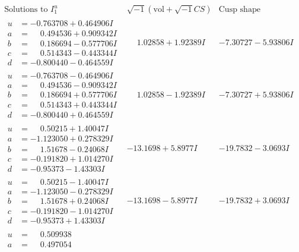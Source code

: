 \documentclass[1p]{elsarticle_modified}
\theoremstyle{definition}
\newcommand{\I}{\sqrt{-1}}
\begin{document}
$$\begin{array}{c|c|c}  
\text{Solutions to }I^u_{1}& \I (\text{vol} + \sqrt{-1}CS) & \text{Cusp shape}\\
 \hline 
\begin{aligned}
u &= -0.763708 + 0.464906 I \\
a &= \phantom{-}0.494536 + 0.909342 I \\
b &= \phantom{-}0.186694 - 0.577706 I \\
c &= \phantom{-}0.514343 - 0.443344 I \\
d &= -0.800440 - 0.464559 I\end{aligned}
 & \phantom{-}1.02858 + 1.92389 I & -7.30727 - 5.93806 I \\ \hline\begin{aligned}
u &= -0.763708 - 0.464906 I \\
a &= \phantom{-}0.494536 - 0.909342 I \\
b &= \phantom{-}0.186694 + 0.577706 I \\
c &= \phantom{-}0.514343 + 0.443344 I \\
d &= -0.800440 + 0.464559 I\end{aligned}
 & \phantom{-}1.02858 - 1.92389 I & -7.30727 + 5.93806 I \\ \hline\begin{aligned}
u &= \phantom{-}0.50215 + 1.40047 I \\
a &= -1.123050 + 0.278329 I \\
b &= \phantom{-}1.51678 - 0.24068 I \\
c &= -0.191820 + 1.014270 I \\
d &= -0.95373 - 1.43303 I\end{aligned}
 & -13.1698 + 5.8977 I & -19.7832 - 3.0693 I \\ \hline\begin{aligned}
u &= \phantom{-}0.50215 - 1.40047 I \\
a &= -1.123050 - 0.278329 I \\
b &= \phantom{-}1.51678 + 0.24068 I \\
c &= -0.191820 - 1.014270 I \\
d &= -0.95373 + 1.43303 I\end{aligned}
 & -13.1698 - 5.8977 I & -19.7832 + 3.0693 I \\ \hline\begin{aligned}
u &= \phantom{-}0.509938\phantom{ +0.000000I} \\
a &= \phantom{-}0.497054\phantom{ +0.000000I} \\

\end{aligned}
\end{array}$$
\end{document}
